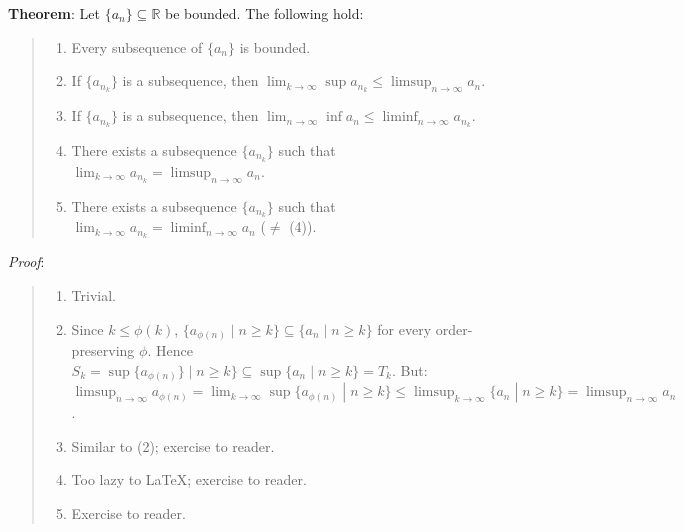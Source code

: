 \documentclass[11pt]{article}
\begin{document}
\textbf{Theorem}: Let $\{a_n\} \subseteq \mathbb{R}$ be bounded. The following hold:
\begin{quote}\vspace{-0.3cm}
	\begin{enumerate}
	\item Every subsequence of $\{a_n\}$ is bounded.
	\item If $\{a_{n_k}\}$ is a subsequence, then $\lim_{k \to \infty} \sup a_{n_k} \leq \limsup_{n \to \infty} a_n$.
	\item If $\{a_{n_k}\}$ is a subsequence, then $\lim_{n \to \infty} \inf a_n \leq \liminf_{n \to \infty} a_{n_k}$.
	\item There exists a subsequence $\{a_{n_k}\}$ such that $\lim_{k \to \infty} a_{n_k} = \limsup_{n \to \infty} a_n$.
	\item There exists a subsequence $\{a_{n_k}\}$ such that $\lim_{k \to \infty} a_{n_k} = \liminf_{n \to \infty} a_n$ ($\neq$ (4)).
	\end{enumerate}
\end{quote}

\emph{Proof}:
\begin{quote}\vspace{-0.3cm}
	\begin{enumerate}
	\item Trivial.
	\item Since $k \leq \phi(k)$, $\{a_{\phi(n)} \;|\; n \geq k\} \subseteq \{a_n \;|\; n \geq k\}$ for every order-preserving $\phi$. Hence $S_k = \sup \{a_{\phi(n)}\} \;|\; n \geq k\} \subseteq \sup \{a_n \;|\; n \geq k\} = T_k$. But:\\
	$\limsup_{n \to \infty} a_{\phi(n)} = \lim_{k \to \infty} \sup \{a_{\phi(n)} \;|\; n \geq k\} \leq \limsup_{k \to \infty} \{a_n \;|\; n \geq k\} = \limsup_{n \to \infty} a_n$.
	\item Similar to (2); exercise to reader.
	\item Too lazy to \LaTeX; exercise to reader. %
	\item Exercise to reader.
	\end{enumerate}
\end{quote}
\end{document}
